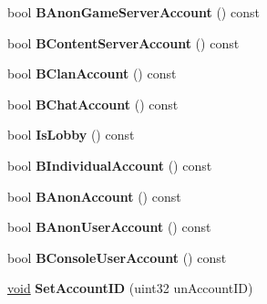 \begin{DoxyCompactItemize}
\item 
\hypertarget{classCSteamID_a05dc8957511b06b11d6a79d80554a88b}{}bool {\bfseries B\+Anon\+Game\+Server\+Account} () const \label{classCSteamID_a05dc8957511b06b11d6a79d80554a88b}

\item 
\hypertarget{classCSteamID_a22362924ba513a6641bca85aa1bbf249}{}bool {\bfseries B\+Content\+Server\+Account} () const \label{classCSteamID_a22362924ba513a6641bca85aa1bbf249}

\item 
\hypertarget{classCSteamID_a9a28b5ed92e5240cb4122e131bd797a2}{}bool {\bfseries B\+Clan\+Account} () const \label{classCSteamID_a9a28b5ed92e5240cb4122e131bd797a2}

\item 
\hypertarget{classCSteamID_a396b42ea615af5dba0abe435cca4a013}{}bool {\bfseries B\+Chat\+Account} () const \label{classCSteamID_a396b42ea615af5dba0abe435cca4a013}

\item 
\hypertarget{classCSteamID_ae94df1c7cb72e7d32130f40baaad0aa6}{}bool {\bfseries Is\+Lobby} () const \label{classCSteamID_ae94df1c7cb72e7d32130f40baaad0aa6}

\item 
\hypertarget{classCSteamID_a79db9e1801268517119e481e2297bef5}{}bool {\bfseries B\+Individual\+Account} () const \label{classCSteamID_a79db9e1801268517119e481e2297bef5}

\item 
\hypertarget{classCSteamID_aba7085ac3e0ba1a138f94e51ef1fe213}{}bool {\bfseries B\+Anon\+Account} () const \label{classCSteamID_aba7085ac3e0ba1a138f94e51ef1fe213}

\item 
\hypertarget{classCSteamID_adfa4cccf5368d299d89a1307287a64cd}{}bool {\bfseries B\+Anon\+User\+Account} () const \label{classCSteamID_adfa4cccf5368d299d89a1307287a64cd}

\item 
\hypertarget{classCSteamID_a2bf6e8838469187007f516e779267ea7}{}bool {\bfseries B\+Console\+User\+Account} () const \label{classCSteamID_a2bf6e8838469187007f516e779267ea7}

\item 
\hypertarget{classCSteamID_ac13793c8698c2b16e63a67c00a517413}{}\hyperlink{SDL__audio_8h_a52835ae37c4bb905b903cbaf5d04b05f}{void} {\bfseries Set\+Account\+I\+D} (uint32 un\+Account\+I\+D)\label{classCSteamID_ac13793c8698c2b16e63a67c00a517413}


\end{DoxyCompactItemize}
